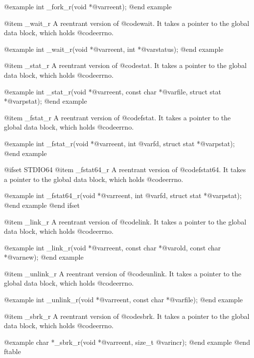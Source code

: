 @example
int _fork_r(void *@var{reent});
@end example

@item _wait_r
A reentrant version of @code{wait}.  It takes a pointer to the global
data block, which holds @code{errno}.

@example
int _wait_r(void *@var{reent}, int *@var{status});
@end example

@item _stat_r
A reentrant version of @code{stat}.  It takes a pointer to the global
data block, which holds @code{errno}.

@example
int _stat_r(void *@var{reent},
    const char *@var{file}, struct stat *@var{pstat});
@end example

@item _fstat_r
A reentrant version of @code{fstat}.  It takes a pointer to the global
data block, which holds @code{errno}.

@example
int _fstat_r(void *@var{reent},
    int @var{fd}, struct stat *@var{pstat});
@end example

@ifset STDIO64
@item _fstat64_r
A reentrant version of @code{fstat64}.  It takes a pointer to the global
data block, which holds @code{errno}.

@example
int _fstat64_r(void *@var{reent},
    int @var{fd}, struct stat *@var{pstat});
@end example
@end ifset

@item _link_r
A reentrant version of @code{link}.  It takes a pointer to the global
data block, which holds @code{errno}.

@example
int _link_r(void *@var{reent},
    const char *@var{old}, const char *@var{new});
@end example

@item _unlink_r
A reentrant version of @code{unlink}.  It takes a pointer to the global
data block, which holds @code{errno}.

@example
int _unlink_r(void *@var{reent}, const char *@var{file});
@end example

@item _sbrk_r
A reentrant version of @code{sbrk}.  It takes a pointer to the global
data block, which holds @code{errno}.

@example
char *_sbrk_r(void *@var{reent}, size_t @var{incr});
@end example
@end ftable
